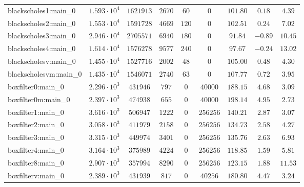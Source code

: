 \begin{tabular}{|l|c|c|c|c|c|c|c|c|}
blackscholes1:main\_0          & $ 1.593 \cdot 10^{4} $ & $ 1621913  $ & $ 2670   $ & $ 60   $ & $ 0        $ & $ 101.80      $ & $ 0.18    $ & $ 4.39    $ \\
blackscholes2:main\_0          & $ 1.553 \cdot 10^{4} $ & $ 1591728  $ & $ 4669   $ & $ 120  $ & $ 0        $ & $ 102.51      $ & $ 0.24    $ & $ 7.02    $ \\
blackscholes3:main\_0          & $ 2.946 \cdot 10^{4} $ & $ 2705571  $ & $ 6940   $ & $ 180  $ & $ 0        $ & $ 91.84       $ & $ -0.89   $ & $ 10.45   $ \\
blackscholes4:main\_0          & $ 1.614 \cdot 10^{4} $ & $ 1576278  $ & $ 9577   $ & $ 240  $ & $ 0        $ & $ 97.67       $ & $ -0.24   $ & $ 13.02   $ \\
blackscholesv:main\_0          & $ 1.455 \cdot 10^{4} $ & $ 1527716  $ & $ 2002   $ & $ 48   $ & $ 0        $ & $ 105.00      $ & $ 0.48    $ & $ 4.30    $ \\
blackscholesvm:main\_0         & $ 1.435 \cdot 10^{4} $ & $ 1546071  $ & $ 2740   $ & $ 63   $ & $ 0        $ & $ 107.77      $ & $ 0.72    $ & $ 3.95    $ \\
boxfilter0:main\_0             & $ 2.296 \cdot 10^{3} $ & $ 431946   $ & $ 797    $ & $ 0    $ & $ 40000    $ & $ 188.15      $ & $ 4.68    $ & $ 3.09    $ \\
boxfilter0m:main\_0            & $ 2.397 \cdot 10^{3} $ & $ 474938   $ & $ 655    $ & $ 0    $ & $ 40000    $ & $ 198.14      $ & $ 4.95    $ & $ 2.73    $ \\
boxfilter1:main\_0             & $ 3.616 \cdot 10^{3} $ & $ 506947   $ & $ 1222   $ & $ 0    $ & $ 256256   $ & $ 140.21      $ & $ 2.87    $ & $ 3.07    $ \\
boxfilter2:main\_0             & $ 3.058 \cdot 10^{3} $ & $ 411979   $ & $ 2158   $ & $ 0    $ & $ 256256   $ & $ 134.73      $ & $ 2.58    $ & $ 4.27    $ \\
boxfilter3:main\_0             & $ 3.315 \cdot 10^{3} $ & $ 449974   $ & $ 3401   $ & $ 0    $ & $ 256256   $ & $ 135.76      $ & $ 2.63    $ & $ 6.93    $ \\
boxfilter4:main\_0             & $ 3.164 \cdot 10^{3} $ & $ 375989   $ & $ 4224   $ & $ 0    $ & $ 256256   $ & $ 118.85      $ & $ 1.59    $ & $ 5.81    $ \\
boxfilter8:main\_0             & $ 2.907 \cdot 10^{3} $ & $ 357994   $ & $ 8290   $ & $ 0    $ & $ 256256   $ & $ 123.15      $ & $ 1.88    $ & $ 11.53   $ \\
boxfilterv:main\_0             & $ 2.389 \cdot 10^{3} $ & $ 431939   $ & $ 817    $ & $ 0    $ & $ 40256    $ & $ 180.80      $ & $ 4.47    $ & $ 3.24    $ \\

\end{tabular}
